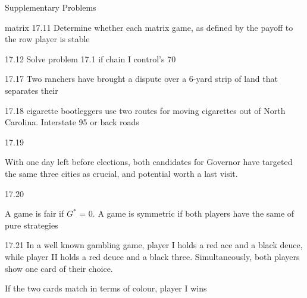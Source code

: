 \documentclass[]{report}
\begin{document}


Supplementary Problems


matrix
17.11 
Determine whether each matrix game, as defined by the payoff to the row player is stable



17.12 Solve problem 17.1 if chain I control's 70%

17.17 Two ranchers have brought a dispute over a 6-yard strip of land that separates 
their


17.18 cigarette bootleggers use two routes for moving cigarettes out of North Carolina.
Interstate 95 or back roads



17.19

With one day left before elections, both candidates for Governor have targeted the same three 
cities as crucial, and potential worth a last visit.

17.20

A game is fair if $G^{\ast}$ = 0.
A game is symmetric if both players have the same of pure strategies


17.21
In a well known gambling game, player I holds a red ace and a black deuce, while player II holds
a red deuce and a black three.
Simultaneously, both players show one card of their choice.

If the two cards match in terms of colour, player 
I wins
\end{document}
